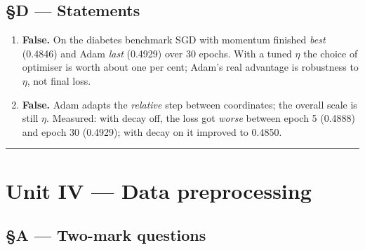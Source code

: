 \documentclass[11pt,a4paper]{article}
\newcommand{\A}[1]{\item[\textbf{#1}]}
\begin{document}
\subsection*{§D --- Statements}

\begin{enumerate}[leftmargin=1.9cm]
\A{U3.51} \textbf{False.} On the diabetes benchmark SGD with momentum finished
\emph{best} (0.4846) and Adam \emph{last} (0.4929) over 30 epochs. With a tuned
$\eta$ the choice of optimiser is worth about one per cent; Adam's real
advantage is robustness to $\eta$, not final loss.
\A{U3.52} \textbf{False.} Adam adapts the \emph{relative} step between
coordinates; the overall scale is still $\eta$. Measured: with decay off, the
loss got \emph{worse} between epoch 5 (0.4888) and epoch 30 (0.4929); with
decay on it improved to 0.4850.
\end{enumerate}

\vspace{0.4em}\hrule

\section*{Unit IV --- Data preprocessing}

\subsection*{§A --- Two-mark questions}
\end{document}
